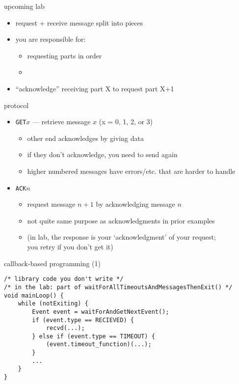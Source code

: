 \begin{frame}{upcoming lab}
    \begin{itemize}
    \item request + receive message split into pieces
    \item you are responsible for:
        \begin{itemize}
        \item requesting parts in order
        \item {}
        \end{itemize}
    \item ``acknowledge'' receiving part X to request part X+1
    \end{itemize}
\end{frame}

\begin{frame}{protocol}
    \begin{itemize}
    \item {\tt GET$x$} --- retrieve message $x$ (x = 0, 1, 2, or 3)
        \begin{itemize}
        \item other end acknowledges by giving data
        \item if they don't acknowledge, you need to send again
        \item higher numbered messages have errors/etc. that are harder to handle
        \end{itemize}
    \item {\tt ACK$n$ }
        \begin{itemize}
        \item request message $n + 1$ by acknowledging message $n$
        \item not quite same purpose as acknowledgments in prior examples
        \item (in lab, the response is your `acknowledgment' of your request; \\
            you retry if you don't get it)
        \end{itemize}
    \end{itemize}
\end{frame}


\begin{frame}[fragile]{callback-based programming (1)}
\begin{Verbatim}[fontsize=\small]
/* library code you don't write */
/* in the lab: part of waitForAllTimeoutsAndMessagesThenExit() */
void mainLoop() {
    while (notExiting) {
        Event event = waitForAndGetNextEvent();
        if (event.type == RECIEVED) {
            recvd(...);
        } else if (event.type == TIMEOUT) {
            (event.timeout_function)(...);
        }
        ...
    }
}
\end{Verbatim}
\end{frame}

